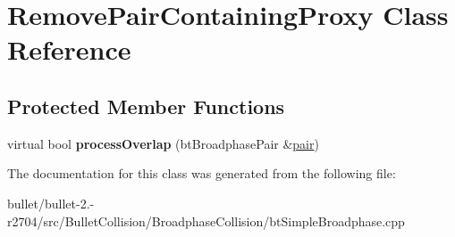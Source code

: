 \hypertarget{class_remove_pair_containing_proxy}{\section{Remove\+Pair\+Containing\+Proxy Class Reference}
\label{class_remove_pair_containing_proxy}
}
\subsection*{Protected Member Functions}
\begin{DoxyCompactItemize}
\item 
\hypertarget{class_remove_pair_containing_proxy_ab8aa857d28e1f4e89a87634373ae3c5a}{virtual bool {\bfseries process\+Overlap} (bt\+Broadphase\+Pair \&\hyperlink{structpair}{pair})}\label{class_remove_pair_containing_proxy_ab8aa857d28e1f4e89a87634373ae3c5a}

\end{DoxyCompactItemize}


The documentation for this class was generated from the following file\+:\begin{DoxyCompactItemize}
\item 
bullet/bullet-\/2.-\/r2704/src/\+Bullet\+Collision/\+Broadphase\+Collision/bt\+Simple\+Broadphase.\+cpp\end{DoxyCompactItemize}
